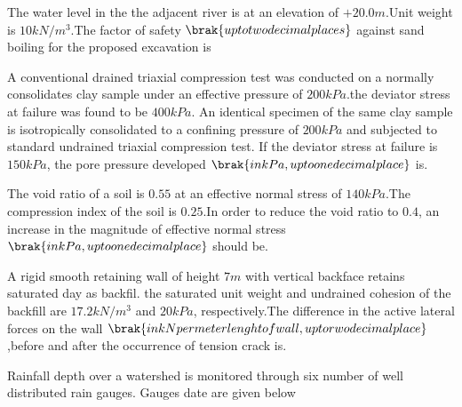  \item The water level in the the adjacent river is at an elevation of $+20.0 m$.Unit weight is $10 kN/m^{3}$.The factor of safety $\brak{up to two decimal places}$ against sand boiling for the proposed excavation is \\
\item A conventional drained triaxial compression test was conducted  on a normally consolidates clay sample under an effective pressure of $200 kPa$.the deviator stress at failure was found to be $400 kPa$. An identical specimen of the same clay sample is isotropically consolidated to a confining pressure of $200 kPa$ and subjected to standard undrained triaxial compression test. If the deviator stress at failure is $150 kPa$, the pore pressure developed $\brak{in kPa, up to one decimal place} $ is.\\
\item The void ratio of a soil is $0.55$ at an effective normal stress of $140 kPa$.The compression index of the soil is $0.25$.In order to reduce the void ratio to $0.4$, an increase in the magnitude of effective normal stress $\brak{in kPa,up to one decimal place}$ should be.\\
\item A rigid smooth retaining wall of height $7 m$ with vertical backface retains saturated day as backfil. the saturated unit weight and undrained cohesion of the backfill are $17.2 kN/m^{3}$ and $20 kPa$, respectively.The difference in the active lateral forces on the wall $\brak{in kN per meter lenght of wall,up to rwo decimal place}$,before and after the occurrence of tension crack is.\\
\item Rainfall depth over a watershed is monitored through six number of well distributed rain gauges. Gauges date are given below\\

